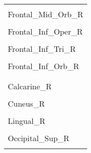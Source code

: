\documentclass[
]{article}
\begin{document}
\begin{table}[htbp]
\begin{tabular}[t]{l}
\hspace{1em}\cellcolor{gray!6}{Frontal\_Mid\_Orb\_L}\\
\hspace{1em}Frontal\_Mid\_Orb\_R\\
\hspace{1em}\cellcolor{gray!6}{Frontal\_Inf\_Oper\_L}\\
\hspace{1em}Frontal\_Inf\_Oper\_R\\
\hspace{1em}\cellcolor{gray!6}{Frontal\_Inf\_Tri\_L}\\
\hspace{1em}Frontal\_Inf\_Tri\_R\\
\hspace{1em}\cellcolor{gray!6}{Frontal\_Inf\_Orb\_L}\\
\hspace{1em}Frontal\_Inf\_Orb\_R\\
\addlinespace[0.3em]
\multicolumn{1}{l}{\textbf{Occipital}}\\
\hspace{1em}\hspace{1em}\cellcolor{gray!6}{Calcarine\_L}\\
\hspace{1em}\hspace{1em}Calcarine\_R\\
\hspace{1em}\hspace{1em}\cellcolor{gray!6}{Cuneus\_L}\\
\hspace{1em}\hspace{1em}Cuneus\_R\\
\hspace{1em}\hspace{1em}\cellcolor{gray!6}{Lingual\_L}\\
\hspace{1em}\hspace{1em}Lingual\_R\\
\hspace{1em}\hspace{1em}\cellcolor{gray!6}{Occipital\_Sup\_L}\\
\hspace{1em}\hspace{1em}Occipital\_Sup\_R\\
\hspace{1em}\hspace{1em}\cellcolor{gray!6}{Occipital\_Mid\_L}\\

\end{tabular}
\end{table}
\end{document}
